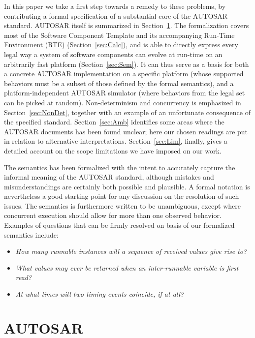 \documentclass[10pt,conference]{IEEEtran}
\begin{document}
In this paper we take a first step towards a remedy to these problems, by contributing a formal specification of a substantial core of the AUTOSAR standard. AUTOSAR itself is summarized in Section~\ref{sec:autosar}. The formalization covers most of the Software Component Template and its accompanying Run-Time Environment (RTE) (Section~\ref{sec:Calc}), and is able to directly express every legal way a system of software components can evolve at run-time on an arbitrarily fast platform (Section~\ref{sec:Sem}). It can thus serve as a basis for both a concrete AUTOSAR implementation on a specific platform (whose supported behaviors must be a subset of those defined by the formal semantics), and a platform-independent AUTOSAR simulator (where behaviors from the legal set can be picked at random).
Non-determinism and concurrency is emphasized in Section~\ref{sec:NonDet}, together with an example of an unfortunate consequence of the specified standard. Section~\ref{sec:Amb} identifies some areas where the AUTOSAR documents has been found unclear; here our chosen readings are put in relation to alternative interpretations. Section~\ref{sec:Lim}, finally, gives a detailed account on the scope limitations we have imposed on our work.

The semantics has been formalized with the intent to accurately capture the informal meaning of the AUTOSAR standard, although mistakes and misunderstandings are certainly both possible and plausible. A formal notation is nevertheless a good starting point for any discussion on the resolution of such issues. The semantics is furthermore written to be unambiguous, except where concurrent execution should allow for more than one observed behavior. Examples of questions that can be firmly resolved on basis of our formalized semantics include:
\begin{itemize}
\item {\em How many runnable instances will a sequence of received values give rise to?}
\item {\em What values may ever be returned when an inter-runnable variable is first read?}
\item {\em At what times will two timing events coincide, if at all?}
\end{itemize}


\section{AUTOSAR}
\label{sec:autosar}
\end{document}
